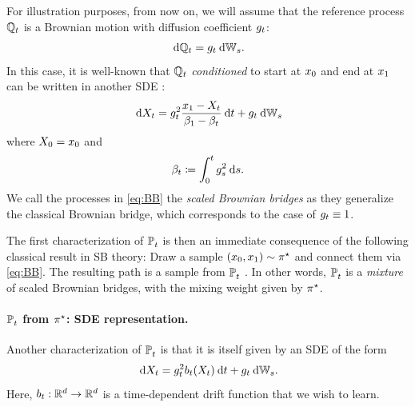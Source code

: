 For illustration purposes, from now on, we will assume that the reference process $\mathbb{Q}_{ t }$ is a Brownian motion with diffusion coefficient $g_{t}$:
\begin{equation}
\label{eq:gtWt}
\dd \refpro = \volat \dWiener.
\end{equation}
In this case, it is well-known that $\mathbb{Q}_{ t }$ \emph{conditioned} to start at $x_0$ and end at $x_1$ can be written in another \acrshort{SDE} \citep{mansuy2008aspects, liu2023learning}:
\begin{equation}
\label{eq:BB}
\dd X_t = \volatsq[\ctime] \frac{\x_1-X_t}{\cvolat[\horizon]-\cvolat[\ctime]} \dt + \volat\dWiener
\end{equation}
where $X_0 = x_0$ and %
\begin{equation}
\beta_{t}\coloneqq \int_0^t g^2_{ s } \:\mathrm{d} s.
\end{equation}We call the processes in \eqref{eq:BB} the \emph{scaled Brownian bridges} as they generalize the classical Brownian bridge, which corresponds to the case of $g_{t} \equiv 1$.

The first characterization of $\mathbb{P}^{}_{ t }$ is then an immediate consequence of the following classical result in \acrlong{SB} theory: Draw a sample $(x_0, x_1) \sim \pi^\star$ and connect them via \eqref{eq:BB}. The resulting path is a sample from $\mathbb{P}^{}_{ t }$ \citep{leonard2013survey, chen2021stochastic}. In other words, $\mathbb{P}^{}_{ t }$ is a \emph{mixture} of scaled Brownian bridges, with the mixing weight given by $\pi^\star$.

\paragraph{$\mathbb{P}^{}_{ t }$ from $\pi^\star$: SDE representation.}

Another characterization of $\mathbb{P}^{}_{ t }$ is that it is itself given by an \acrshort{SDE} of the form \citep{leonard2013survey, chen2021stochastic}
\begin{equation}
\label{eq:SB-SDE}
\dd X_t = \volatsq[\ctime]\fdrift(X_t) \dt + \volat\dWiener.
\end{equation}
Here, $b_t: \mathbb{R}^d \to \mathbb{R}^d$ is a time-dependent drift function that we wish to learn.


